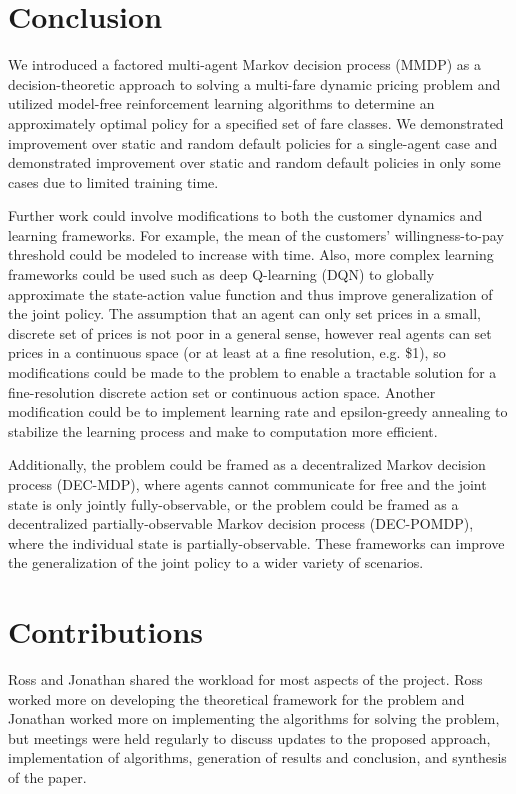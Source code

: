 \documentclass[letterpaper]{article}%
\begin{document}
\clearpage

\section{Conclusion}

We introduced a factored multi-agent Markov decision process (MMDP) as a decision-theoretic approach to solving a multi-fare dynamic pricing problem and utilized model-free reinforcement learning algorithms to determine an approximately optimal policy for a specified set of fare classes. We demonstrated improvement over static and random default policies for a single-agent case and demonstrated improvement over static and random default policies in only some cases due to limited training time.

Further work could involve modifications to both the customer dynamics and learning frameworks. For example, the mean of the customers' willingness-to-pay threshold could be modeled to increase with time. Also, more complex learning frameworks could be used such as deep Q-learning (DQN) to globally approximate the state-action value function and thus improve generalization of the joint policy. The assumption that an agent can only set prices in a small, discrete set of prices is not poor in a general sense, however real agents can set prices in a continuous space (or at least at a fine resolution, e.g. \$1), so modifications could be made to the problem to enable a tractable solution for a fine-resolution discrete action set or continuous action space. Another modification could be to implement learning rate and epsilon-greedy annealing to stabilize the learning process and make to computation more efficient.

Additionally, the problem could be framed as a decentralized Markov decision process (DEC-MDP), where agents cannot communicate for free and the joint state is only jointly fully-observable, or the problem could be framed as a decentralized partially-observable Markov decision process (DEC-POMDP), where the individual state is partially-observable. These frameworks can improve the generalization of the joint policy to a wider variety of scenarios.

\section{Contributions}

Ross and Jonathan shared the workload for most aspects of the project. Ross worked more on developing the theoretical framework for the problem and Jonathan worked more on implementing the algorithms for solving the problem, but meetings were held regularly to discuss updates to the proposed approach, implementation of algorithms, generation of results and conclusion, and synthesis of the paper.



\end{document}
